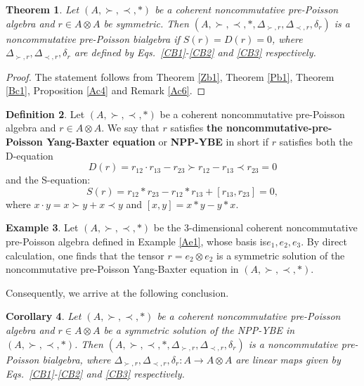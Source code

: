 \documentclass[12pt]{amsart}
\newtheorem{thm}{Theorem}[section]
\newtheorem{cor}[thm]{Corollary}
\theoremstyle{definition}
\newtheorem{defi}[thm]{Definition}
\newtheorem{ex}[thm]{Example}
\begin{document}
\begin{thm} \label{Ac5} Let $(A,\succ,\prec,\ast)$ be a coherent noncommutative pre-Poisson algebra
and $r\in A\otimes A$ be symmetric.
Then $(A, \succ,\prec,\ast,\Delta_{\succ,r},\Delta_{\prec,r},\delta_r)$ is a noncommutative pre-Poisson bialgebra if
$S(r)=D(r)=0$, where $\Delta_{\succ,r},\Delta_{\prec,r},\delta_r$ are defined by Eqs.~\eqref{CB1}-\eqref{CB2} and \eqref{CB3} respectively.
\end{thm}
\begin{proof} 
The statement follows from Theorem \ref{Zb1}, Theorem \ref{Pb1}, Theorem \ref{Bc1}, Proposition \ref{Ac4} and Remark \ref{Ac6}.
\end{proof}

\begin{defi} 
Let $(A,\succ,\prec,\ast)$ be a coherent noncommutative pre-Poisson algebra and $r\in
A\otimes A$. We say that  $r$ satisfies {\bf the noncommutative-pre-Poisson Yang-Baxter equation} or {\bf NPP-YBE} in short
 if $r$ satisfies both the D-equation 
\begin{equation*}D(r)=r_{12}\cdot r_{13}-r_{23}\succ r_{12}-r_{13}\prec r_{23}=0\end{equation*}
 and the S-equation:
\begin{equation*} S(r)=r_{12}\ast r_{23}-r_{12}\ast r_{13}+[r_{13}, r_{23}]=0,\end{equation*}
where $x\cdot y=x\succ y+x\prec y$ and $[x,y]=x\ast y-y\ast x$.
 \end{defi}
 
  \begin{ex} Let $(A, \succ, \prec, \ast)$ be
 the 3-dimensional coherent noncommutative pre-Poisson algebra 
  defined in Example \ref{Ae1}, whose basis  is${e_1, e_2, e_3}$.
   By direct calculation, one finds that the tensor $r = e_2 \otimes e_2$ is a symmetric solution of 
   the noncommutative pre-Poisson Yang-Baxter equation in $(A, \succ, \prec, \ast)$.
  \end{ex}
 
Consequently, we arrive at the following conclusion.
 
\begin{cor}\label{Bc2} 
	Let $(A,\succ,\prec,\ast)$ be a coherent noncommutative pre-Poisson algebra and $r\in A\otimes A$ be
	a symmetric solution of the NPP-YBE in $(A,\succ,\prec,\ast)$.
	Then $(A, \succ,\prec,\ast,\Delta_{\succ,r},\Delta_{\prec,r},\delta_r)$
 is a noncommutative pre-Poisson bialgebra, where $\Delta_{\succ,r},\Delta_{\prec,r},\delta_r:A\rightarrow A\otimes A$ are 
linear maps given by Eqs.~\eqref{CB1}-\eqref{CB2} and \eqref{CB3} respectively.
\end{cor}
\end{document}
